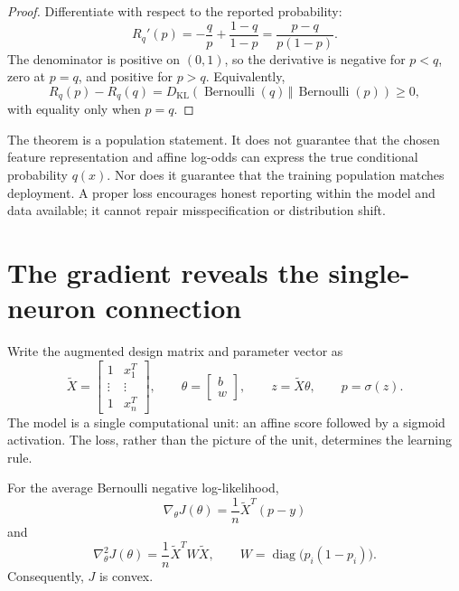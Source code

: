 \begin{proof}
Differentiate with respect to the reported probability:
\[
R_q'(p)=-\frac{q}{p}+\frac{1-q}{1-p}
=\frac{p-q}{p(1-p)}.
\]
The denominator is positive on $(0,1)$, so the derivative is negative for
$p<q$, zero at $p=q$, and positive for $p>q$. Equivalently,
\[
R_q(p)-R_q(q)
=D_{\mathrm{KL}}\!\left(
\operatorname{Bernoulli}(q)\,\Vert\,\operatorname{Bernoulli}(p)
\right)\ge0,
\]
with equality only when $p=q$.
\end{proof}

The theorem is a population statement. It does not guarantee that the chosen
feature representation and affine log-odds can express the true conditional
probability $q(x)$. Nor does it guarantee that the training population matches
deployment. A proper loss encourages honest reporting within the model and data
available; it cannot repair misspecification or distribution shift.


\section{The gradient reveals the single-neuron connection}

Write the augmented design matrix and parameter vector as
\[
\widetilde X=
\begin{bmatrix}
1 & x_1^T\\
\vdots & \vdots\\
1 & x_n^T
\end{bmatrix},
\qquad
\theta=\begin{bmatrix}b\\w\end{bmatrix},
\qquad
z=\widetilde X\theta,
\qquad
p=\sigma(z).
\]
The model is a single computational unit: an affine score followed by a sigmoid
activation. The loss, rather than the picture of the unit, determines the
learning rule.

\begin{theorem}
For the average Bernoulli negative log-likelihood,
\[
\nabla_\theta J(\theta)=\frac1n\widetilde X^T(p-y)
\]
and
\[
\nabla_\theta^2J(\theta)
=\frac1n\widetilde X^T W\widetilde X,
\qquad
W=\operatorname{diag}\!\bigl(p_i(1-p_i)\bigr).
\]
Consequently, $J$ is convex.
\end{theorem}


